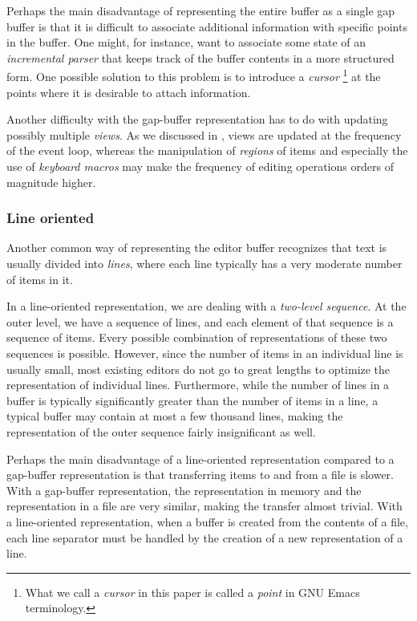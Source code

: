 Perhaps the main disadvantage of representing the entire buffer as a
single gap buffer is that it is difficult to associate additional
information with specific points in the buffer.  One might, for
instance, want to associate some state of an \emph{incremental parser}
that keeps track of the buffer contents in a more structured form.
One possible solution to this problem is to introduce a \emph{cursor}%
\footnote{What we call a \emph{cursor} in this paper is called a
  \emph{point} in GNU Emacs terminology.} at the points where it is
desirable to attach information.

Another difficulty with the gap-buffer representation has to do with
updating possibly multiple \emph{views}.  As we discussed in
, views are updated at the frequency of the
event loop, whereas the manipulation of \emph{regions} of items and
especially the use of \emph{keyboard macros} may make the frequency of
editing operations orders of magnitude higher.

\subsubsection{Line oriented}
\label{sec-previous-line-oriented}

Another common way of representing the editor buffer recognizes that
text is usually divided into \emph{lines}, where each line typically
has a very moderate number of items in it.

In a line-oriented representation, we are dealing with a
\emph{two-level sequence}.  At the outer level, we have a sequence of
lines, and each element of that sequence is a sequence of items.
Every possible combination of representations of these two sequences
is possible.  However, since the number of items in an individual line
is usually small, most existing editors do not go to great lengths to
optimize the representation of individual lines.  Furthermore, while
the number of lines in a buffer is typically significantly greater
than the number of items in a line, a typical buffer may contain at
most a few thousand lines, making the representation of the outer
sequence fairly insignificant as well.

Perhaps the main disadvantage of a line-oriented representation
compared to a gap-buffer representation is that transferring items to
and from a file is slower.  With a gap-buffer representation, the
representation in memory and the representation in a file are very
similar, making the transfer almost trivial.  With a line-oriented
representation, when a buffer is created from the contents of a file,
each line separator must be handled by the creation of a new
representation of a line.

